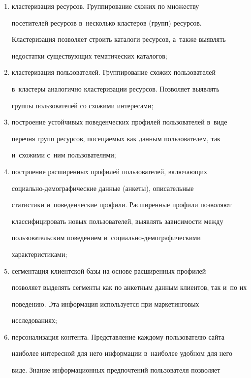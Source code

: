   \begin{enumerate}[(1)]


\item кластеризация ресурсов. Группирование схожих по множеству 


посетителей ресурсов в~несколько кластеров (групп) ресурсов. 


Кластеризация позволяет строить каталоги ресурсов, а~также выявлять 


недостатки существующих тематических каталогов;


\item кластеризация пользователей. Группирование схожих пользователей 


в~клас\-те\-ры аналогично кластеризации ресурсов. Позволяет выявлять 


группы пользователей со схожими интересами;


\item построение устойчивых поведенческих профилей пользователей в~виде 


перечня групп ресурсов, посещаемых как данным пользователем, так 


и~схожими с~ним пользователями; 


\item построение расширенных профилей пользователей, включающих  


со\-ци\-аль\-но-де\-мо\-гра\-фи\-че\-ские данные (анкеты), описательные 


статистики и~поведенческие профили. Расширенные профили позволяют 


классифицировать новых пользователей, выявлять зависимости между 


пользовательским поведением и~со\-ци\-аль\-но-де\-мо\-гра\-фи\-че\-ски\-ми 


характеристиками; 


\item сегментация клиентской базы на основе расширенных профилей 


позволяет выделять сегменты как по анкетным данным клиентов, так и~по их 


поведению. Эта информация используется при маркетинговых 


исследованиях;


\item персонализация контента. Представление каждому пользователю сайта 


наиболее интересной для него информации в~наиболее удобном для него 


виде. Знание информационных предпочтений пользователя позволяет 



\end{enumerate}
